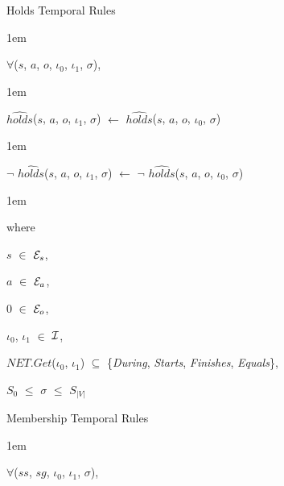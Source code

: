 \documentclass[11pt]{report}
\newenvironment{vquote}
{
  \begin{list}{}{\leftmargin 1em}\item[]
}
{
  \end{list}
}
\begin{document}
            \begin{enumerate}
              \item
                Holds Temporal Rules

                \begin{vquote}
                  $\forall$($s$, $a$, $o$, $\iota_0$, $\iota_1$, $\sigma$),
                \end{vquote}

                \begin{vquote}
                  $\hat{holds}$($s$, $a$, $o$, $\iota_1$, $\sigma$)
                  $\leftarrow$
                  $\hat{holds}$($s$, $a$, $o$, $\iota_0$, $\sigma$)
                \end{vquote}

                \begin{vquote}
                  $\lnot$ $\hat{holds}$($s$, $a$, $o$, $\iota_1$, $\sigma$)
                  $\leftarrow$
                  $\lnot$ $\hat{holds}$($s$, $a$, $o$, $\iota_0$, $\sigma$)
                \end{vquote}

                \begin{vquote}
                  where

                  \hspace{1em}
                  $s$ $\in$ ${\cal E}_s$,

                  \hspace{1em}
                  $a$ $\in$ ${\cal E}_a$,

                  \hspace{1em}
                  $0$ $\in$ ${\cal E}_o$,

                  \hspace{1em}
                  $\iota_0$, $\iota_1$ $\in$ ${\cal I}$,

                  \hspace{1em}
                  $NET.Get$($\iota_0$, $\iota_1$) $\subseteq$
                  \{{\em During}, {\em Starts}, {\em Finishes}, {\em Equals}\},

                  \hspace{1em}
                  $S_0$ $\leq$ $\sigma$ $\leq$ $S_{|V|}$
                \end{vquote}

              \item
                Membership Temporal Rules

                \begin{vquote}
                  $\forall$($ss$, $sg$, $\iota_0$, $\iota_1$, $\sigma$),
                \end{vquote}


\end{enumerate}
\end{document}
